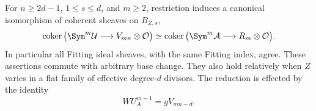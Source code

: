 \begin{theorem}
\label{thm:conductor-reduction}
For $n\ge2d-1$, $1\le s\le d$, and $m\ge2$, restriction induces
a canonical isomorphism of coherent sheaves on $B_{Z,s}$,
\begin{equation}\label{eq:conductor-cokernel}
 \operatorname{coker}\big(\Sym^m\mathcal U\longrightarrow
                         V_{mn}\otimes\mathcal O\big)
 \simeq
 \operatorname{coker}\big(\Sym^m\mathcal A\longrightarrow
                         R_m\otimes\mathcal O\big).
\end{equation}
In particular all Fitting ideal sheaves, with the same Fitting
index, agree. These assertions commute with arbitrary base change.
They also hold relatively when $Z$ varies in a flat family of
effective degree-$d$ divisors. The reduction is effected by the
identity
\begin{equation}\label{eq:conductor-image}
 WU_A^{m-1}=gV_{mn-d}.
\end{equation}
\end{theorem}

